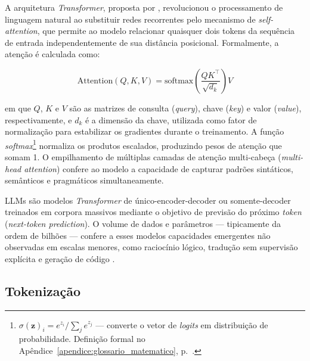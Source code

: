 A arquitetura \textit{Transformer},
proposta por ,
revolucionou o processamento de linguagem natural
ao substituir redes recorrentes
pelo mecanismo de \textit{self-attention},
que permite ao modelo relacionar
quaisquer dois tokens da sequ\^encia de entrada independentemente de sua
dist\^ancia posicional. Formalmente, a aten\c{c}\~ao \'e calculada como:

\begin{equation}
  \text{Attention}(Q, K, V) = \text{softmax}\!\left(\frac{QK^\top}{\sqrt{d_k}}\right)V
  \label{eq:attention}
\end{equation}

\noindent em que $Q$, $K$ e $V$ s\~ao as matrizes de consulta
(\textit{query}), chave (\textit{key}) e valor (\textit{value}),
respectivamente, e $d_k$ \'e a dimens\~ao da chave, utilizada como fator
de normaliza\c{c}\~ao para estabilizar os gradientes durante o treinamento.
A fun\c{c}\~ao \textit{softmax}\footnote{%
  $\sigma(\mathbf{z})_i = e^{z_i}/\!\sum_j e^{z_j}$ --- converte o vetor
  de \textit{logits} em distribui\c{c}\~ao de probabilidade. Defini\c{c}\~ao
  formal no Ap\^endice~\ref{apendice:glossario_matematico},
  p.~\pageref{sec:softmax}.} normaliza os produtos escalados, produzindo
pesos de aten\c{c}\~ao que somam 1. O empilhamento de m\'ultiplas camadas de
aten\c{c}\~ao multi-cabe\c{c}a
(\textit{multi-head attention}) confere ao modelo a capacidade de capturar
padr\~oes sint\'aticos, sem\^anticos e pragm\'aticos simultaneamente.

LLMs s\~ao modelos \textit{Transformer} de \'unico-encoder-decoder ou
somente-decoder treinados em corpora massivos mediante o objetivo de
previs\~ao do pr\'oximo \textit{token} (\textit{next-token prediction}).
O volume de dados e par\^ametros --- tipicamente da ordem de bilh\~oes
--- confere a esses modelos capacidades emergentes n\~ao observadas em
escalas menores, como racioc\'inio l\'ogico, tradu\c{c}\~ao sem
supervis\~ao expl\'icita e gera\c{c}\~ao de c\'odigo
\cite{wei2022emergent}.

\subsection{Tokeniza\c{c}\~ao}

